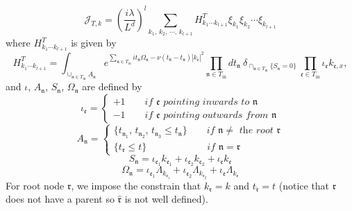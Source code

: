 \begin{lem}
\begin{equation}\label{eq.coefterm.threewave}
\mathcal{J}_{T,k}=\left(\frac{i\lambda}{L^{d}}\right)^l\sum_{k_1,\, k_2,\, \cdots,\, k_{l+1}} H^T_{k_1\cdots k_{l+1}}  \xi_{k_1}\xi_{k_2}\cdots\xi_{k_{l+1}}   
\end{equation}
where $H^T_{k_1\cdots k_{l+1}}$ is given by
\begin{equation}\label{eq.coef.threewave}
H^T_{k_1\cdots k_{l+1}}=\int_{\cup_{\mathfrak{n}\in T_{\text{in}}} A_{\mathfrak{n}}} e^{\sum_{\mathfrak{n}\in T_{\text{in}}} it_{\mathfrak{n}}\Omega_{\mathfrak{n}}-\nu(t_{\widehat{\mathfrak{n}}}-t_{\mathfrak{n}})|k_{\mathfrak{e}}|^2} \prod_{\mathfrak{n}\in T_{\text{in}}} dt_{\mathfrak{n}} %
\ \delta_{\cap_{\mathfrak{n}\in T_{\text{in}}} \{S_{\mathfrak{n}}=0\}}\ \prod_{\mathfrak{e}\in T_{\text{in}}}\iota_{\mathfrak{e}}k_{\mathfrak{e},x} ,
\end{equation}
and $\iota$, $A_{\mathfrak{n}}$, $S_{\mathfrak{n}}$, $\Omega_{\mathfrak{n}}$ are defined by 
\begin{equation}\label{eq.iotadef.threewave}
    \iota_{\mathfrak{e}}=\begin{cases}
        +1 \qquad \textit{if $\mathfrak{e}$ pointing inwards to $\mathfrak{n}$}
        \\
        -1 \qquad  \textit{if $\mathfrak{e}$ pointing outwards from $\mathfrak{n}$}
    \end{cases}
\end{equation}
\begin{equation}
    A_{\mathfrak{n}}=
        \begin{cases}
            \{t_{\mathfrak{n}_1},\, t_{\mathfrak{n}_2},\, t_{\mathfrak{n}_3}\le t_{\mathfrak{n}}\} \qquad \textit{if $\mathfrak{n}\ne$ the root $\mathfrak{r}$}
            \\
            \{t_{\mathfrak{r}}\le t\} \qquad\qquad\qquad\  \textit{if $\mathfrak{n}= \mathfrak{r}$ }
        \end{cases}
\end{equation}
\begin{equation}\label{eq.defnS_n.threewave}
    S_{\mathfrak{n}}=\iota_{\mathfrak{e}_1}k_{\mathfrak{e}_1}+\iota_{\mathfrak{e}_2}k_{\mathfrak{e}_2}+\iota_{\mathfrak{e}}k_{\mathfrak{e}}
\end{equation}
\begin{equation}
    \Omega_{\mathfrak{n}}=\iota_{\mathfrak{e}_1}\Lambda_{k_{\mathfrak{e}_1}}+\iota_{\mathfrak{e}_2}\Lambda_{k_{\mathfrak{e}_2}}+\iota_{\mathfrak{e}}\Lambda_{k_{\mathfrak{e}}}
\end{equation}
For root node $\mathfrak{r}$, we impose the constrain that $k_{\mathfrak{r}}=k$ and $t_{\widehat{\mathfrak{r}}}=t$ (notice that $\mathfrak{r}$ does not have a parent so $\widehat{\mathfrak{r}}$ is not well defined). 
\end{lem}


